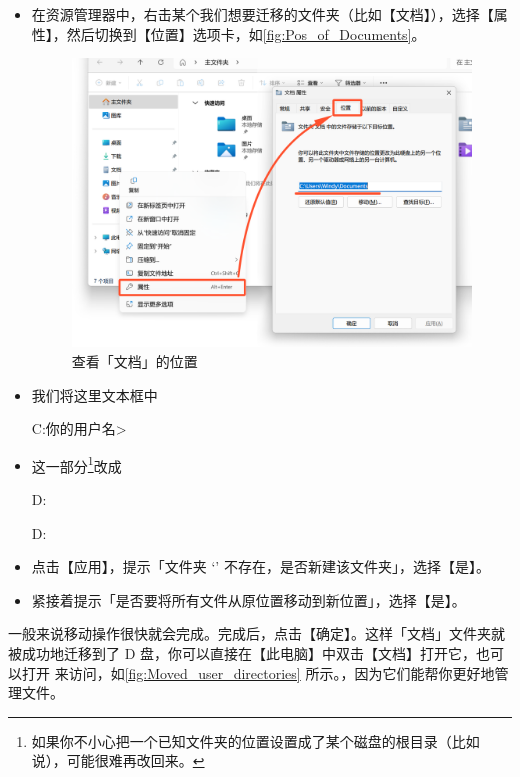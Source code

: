 {{{{{\begin{itemize}
  \item 在资源管理器中，右击某个我们想要迁移的文件夹（比如【文档】），选择【属性】，然后切换到【位置】选项卡，如\autoref{fig:Pos_of_Documents}。
    \begin{figure}[htb!]
      \centering
      \includegraphics[width=.7\textwidth]{assets/basic/Pos_of_Documents.png}
      \caption{查看「文档」的位置}
      \label{fig:Pos_of_Documents}
    \end{figure}
  \item 我们将这里文本框中
    \begin{MissingVerbatim}
      C:\Users\<你的用户名>\
    \end{MissingVerbatim}
  \item 这一部分\cprotect{}\footnote{如果你不小心把一个已知文件夹的位置设置成了某个磁盘的根目录（比如说），可能很难再改回来。}改成
    \begin{MissingVerbatim}
      D:\
    \end{MissingVerbatim}
    \begin{MissingVerbatim}
      D:\Documents
    \end{MissingVerbatim}
  \item 点击【应用】，提示「文件夹 ‘’ 不存在，是否新建该文件夹」，选择【是】。
  \item 紧接着提示「是否要将所有文件从原位置移动到新位置」，选择【是】。
\end{itemize}

一般来说移动操作很快就会完成。完成后，点击【确定】。这样「文档」文件夹就被成功地迁移到了 D 盘，你可以直接在【此电脑】中双击【文档】打开它，也可以打开  来访问，如\autoref{fig:Moved_user_directories} 所示。，因为它们能帮你更好地管理文件。

}}}}}

